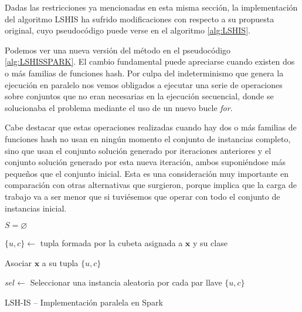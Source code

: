 Dadas las restricciones ya mencionadas en esta misma sección, la implementación del algoritmo LSHIS ha sufrido modificaciones con respecto a su propuesta original, cuyo pseudocódigo puede verse en el algoritmo \ref{alg:LSHIS}.

Podemos ver una nueva versión del método en el pseudocódigo \ref{alg:LSHISSPARK}. El cambio fundamental puede apreciarse cuando existen dos o más familias de funciones hash. Por culpa del indeterminismo que genera la ejecución en paralelo nos vemos obligados a ejecutar una serie de operaciones sobre conjuntos que no eran necesarias en la ejecución secuencial, donde se solucionaba el problema mediante el uso de un nuevo bucle \textit{for}.

Cabe destacar que estas operaciones realizadas cuando hay dos o más familias de funciones hash no usan en ningún momento el conjunto de instancias completo, sino que usan el conjunto solución generado por iteraciones anteriores y el conjunto solución generado por esta nueva iteración, ambos suponiéndose más pequeños que el conjunto inicial. Esta es una consideración muy importante en comparación con otras alternativas que surgieron, porque implica que la carga de trabajo va a ser menor que si tuviésemos que operar con todo el conjunto de instancias inicial.


\begin{algorithm*}
\DontPrintSemicolon
{}

$ S = \varnothing $

 {

   {
        $\{u,c\}\leftarrow$ tupla formada por la cubeta asignada a $\mathbf{x}$ y su clase

        Asociar $\mathbf{x}$ a su tupla $\{u,c\}$
    }

    $sel\leftarrow$ Seleccionar una instancia aleatoria por cada par llave $\{u,c\}$


}

\caption{LSH-IS -- Implementación paralela en Spark}
\label{alg:LSHISSPARK}
\end{algorithm*}

